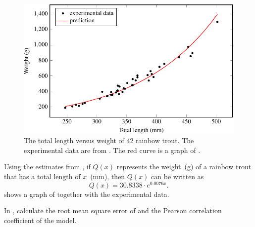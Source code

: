 \documentclass[a4paper,oneside,12pt]{article}
\begin{document}
\begin{solution}
\begin{figure}[!htbp]
\centering
\includegraphics[scale=1.1]{image/12/rainbow-trout.pdf}
\caption{%
  The total length versus weight of $42$ rainbow trout.  The
  experimental data are from .  The
  red curve is a graph of
  .
}
\label{fig:rainbow_trout_prediction}
\end{figure}

Using the estimates
from , if $Q(x)$
represents the weight~(g) of a rainbow trout that has a total length
of $x$~(mm), then $Q(x)$ can be written as
\begin{equation}
\label{eqn:logarithm:rainbow_trout_prediction}
Q(x)
=
30.8338 \cdot e^{0.0076 x}.
\end{equation}
 shows a graph of
 together with the
experimental data.
\end{solution}

\begin{exercise}
In , calculate the root mean
square error of
 and the Pearson
correlation coefficient of the model.
\end{exercise}

\end{document}
